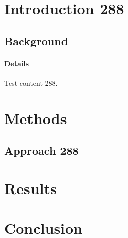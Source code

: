 \documentclass{article}
\begin{document}
\section{Introduction 288}
\subsection{Background}
\paragraph{Details} Test content 288.
\section{Methods}
\subsection{Approach 288}
\section{Results}
\section{Conclusion}
\end{document}
